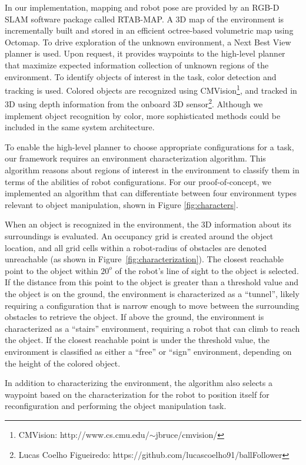 \documentclass[conference]{IEEEtran}
\begin{document}
In our implementation, mapping and robot pose are provided by an RGB-D SLAM software package called RTAB-MAP\cite{rtabmap}. A 3D map of the environment is incrementally built and stored in an efficient octree-based volumetric map using Octomap\cite{octomap}. To drive exploration of the unknown environment, a Next Best View planner \cite{Daudelin2017} is used. Upon request, it provides waypoints to the high-level planner that maximize expected information collection of unknown regions of the environment. To identify objects of interest in the task, color detection and tracking is used.  Colored objects are recognized using CMVision\footnote{CMVision: http://www.cs.cmu.edu/$\sim$jbruce/cmvision/}, and tracked in 3D using depth information from the onboard 3D sensor\footnote{Lucas Coelho Figueiredo: https://github.com/lucascoelho91/ballFollower}. Although we implement object recognition by color, more sophisticated methods could be included in the same system architecture.

To enable the high-level planner to choose appropriate configurations for a task, our framework requires an environment characterization algorithm. This algorithm reasons about regions of interest in the environment to classify them in terms of the abilities of robot configurations. For our proof-of-concept, we implemented an algorithm that can differentiate between four environment types relevant to object manipulation, shown in Figure \ref{fig:characters}. 

When an object is recognized in the environment, the 3D information about its surroundings is evaluated. An occupancy grid is created around the object location, and all grid cells within a robot-radius of obstacles are denoted unreachable (as shown in Figure~\ref{fig:characterization}). The closest reachable point to the object within $20^o$ of the robot's line of sight to the object is selected. If the distance from this point to the object is greater than a threshold value and the object is on the ground, the environment is characterized as a ``tunnel'', likely requiring a configuration that is narrow enough to move between the surrounding obstacles to retrieve the object. If above the ground, the environment is characterized as a ``stairs'' environment, requiring a robot that can climb to reach the object. If the closest reachable point is under the threshold value, the environment is classified as either a ``free'' or ``sign'' environment, depending on the height of the colored object.

In addition to characterizing the environment, the algorithm also selects a waypoint based on the characterization for the robot to position itself for reconfiguration and performing the object manipulation task.
\end{document}
